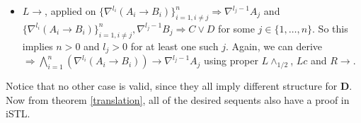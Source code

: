 \begin{itemize}[label=-]
	\item $L\rightarrow$, applied on $\{ \nabla^{l_i} (A_i \rightarrow B_i) \}_{i=1, i \neq j}^n \Rightarrow \nabla^{l_j - 1} A_j$ and $\{ \nabla^{l_i} (A_i \rightarrow B_i) \}_{i=1, i \neq j}^n , \nabla^{l_j - 1} B_j \Rightarrow C \lor D$ for some $j \in \{ 1 , \dots , n \}$. So this implies $n>0$ and $l_j>0$ for at least one such $j$. Again, we can derive $\Rightarrow  \bigwedge_{i=1}^n (\nabla^{l_i} (A_i \rightarrow B_i)) \rightarrow \nabla^{l_j - 1} A_j$ using proper $L\land_{1/2}$, $Lc$ and $R\rightarrow$.
\end{itemize}
Notice that no other case is valid, since they all imply different structure for $\mathbf{D}$. Now from theorem \ref{translation}, all of the desired sequents also have a proof in iSTL.
